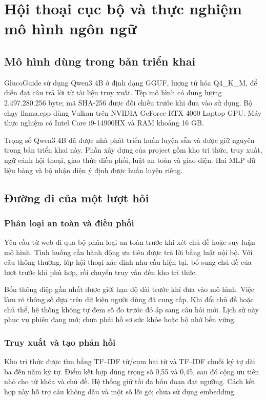 \chapter{Hội thoại cục bộ và thực nghiệm mô hình ngôn ngữ}
\section{Mô hình dùng trong bản triển khai}
GlucoGuide sử dụng Qwen3 4B ở định dạng GGUF, lượng tử hóa Q4\_K\_M, để diễn đạt câu trả lời từ tài liệu truy xuất. Tệp mô hình có dung lượng 2.497.280.256 byte; mã SHA-256 được đối chiếu trước khi đưa vào sử dụng. Bộ chạy llama.cpp dùng Vulkan trên NVIDIA GeForce RTX 4060 Laptop GPU. Máy thực nghiệm có Intel Core i9-14900HX và RAM khoảng 16 GB.

Trọng số Qwen3 4B đã được nhà phát triển huấn luyện sẵn và được giữ nguyên trong bản triển khai này. Phần xây dựng của project gồm kho tri thức, truy xuất, ngữ cảnh hội thoại, giao thức điều phối, luật an toàn và giao diện. Hai MLP dữ liệu bảng và bộ nhận diện ý định được huấn luyện riêng.
\section{Đường đi của một lượt hỏi}
\subsection{Phân loại an toàn và điều phối}
Yêu cầu từ web đi qua bộ phân loại an toàn trước khi xét chủ đề hoặc suy luận mô hình. Tình huống cần hành động ưu tiên được trả lời bằng luật nội bộ. Với câu thông thường, lớp hội thoại xác định nhu cầu hiện tại, bổ sung chủ đề của lượt trước khi phù hợp, rồi chuyển truy vấn đến kho tri thức.

Bốn thông điệp gần nhất được giới hạn độ dài trước khi đưa vào mô hình. Việc làm rõ thông số dựa trên dữ kiện người dùng đã cung cấp. Khi đổi chủ đề hoặc chủ thể, hệ thống không tự đem số đo trước đó áp sang câu hỏi mới. Lịch sử này phục vụ phiên đang mở; chưa phải hồ sơ sức khỏe hoặc bộ nhớ bền vững.
\subsection{Truy xuất và tạo phản hồi}
Kho tri thức được tìm bằng TF--IDF từ/cụm hai từ và TF--IDF chuỗi ký tự dài ba đến năm ký tự. Điểm kết hợp dùng trọng số 0,55 và 0,45, sau đó cộng ưu tiên nhỏ cho từ khóa và chủ đề. Hệ thống giữ tối đa bốn đoạn đạt ngưỡng. Cách kết hợp này hỗ trợ câu không dấu và một số lỗi gõ; chưa sử dụng embedding.

